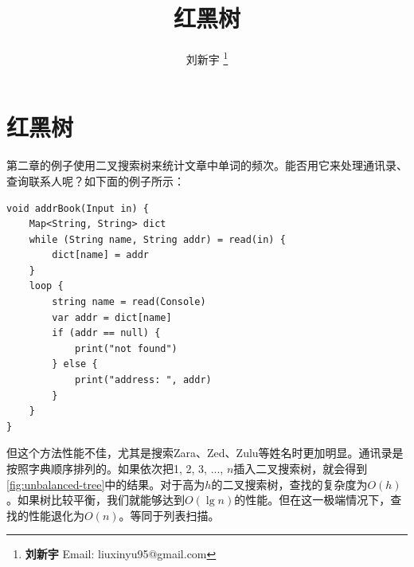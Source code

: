 \documentclass[b5paper]{ctexart}
\begin{document}
\title{红黑树}

\author{刘新宇
\thanks{{\bfseries 刘新宇} \newline
  Email: liuxinyu95@gmail.com \newline}
  }

\maketitle
\fi


\ifx\wholebook\relax
\chapter{红黑树}
\fi

第二章的例子使用二叉搜索树来统计文章中单词的频次。能否用它来处理通讯录、查询联系人呢？如下面的例子所示：

\lstset{frame = single}
\begin{lstlisting}[language=Bourbaki]
void addrBook(Input in) {
    Map<String, String> dict
    while (String name, String addr) = read(in) {
        dict[name] = addr
    }
    loop {
        string name = read(Console)
        var addr = dict[name]
        if (addr == null) {
            print("not found")
        } else {
            print("address: ", addr)
        }
    }
}
\end{lstlisting}

但这个方法性能不佳，尤其是搜索Zara、Zed、Zulu等姓名时更加明显。通讯录是按照字典顺序排列的。如果依次把1, 2, 3, ..., $n$插入二叉搜索树，就会得到\cref{fig:unbalanced-tree}中的结果。对于高为$h$的二叉搜索树，查找的复杂度为$O(h)$。如果树比较平衡，我们就能够达到$O(\lg n)$的性能。但在这一极端情况下，查找的性能退化为$O(n)$。等同于列表扫描。
\end{document}
